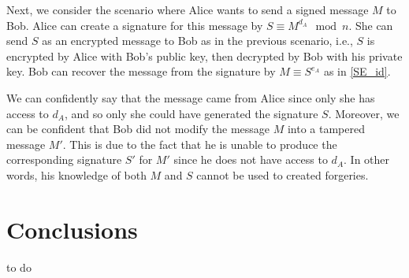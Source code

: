 \documentclass[10pt]{article}
\begin{document}
Next, we consider the scenario where Alice wants to send a signed message $M$ to Bob. Alice can create a signature for this message by $S \equiv M^{d_A} \mod n$. She can send $S$ as an encrypted message to Bob as in the previous scenario, i.e., $S$ is encrypted by Alice with Bob's public key, then decrypted by Bob with his private key. Bob can recover the message from the signature by $M \equiv S^{e_A}$ as in \ref{SE_id}. 

We can confidently say that the message came from Alice since only she has access to $d_A$, and so only she could have generated the signature $S$. Moreover, we can be confident that Bob did not modify the message $M$ into a tampered message $M'$. This is due to the fact that he is unable to produce the corresponding signature $S'$ for $M'$ since he does not have access to $d_A$. In other words, his knowledge of both $M$ and $S$ cannot be used to created forgeries.


\section{Conclusions}
to do



\end{document}
